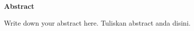 \begin{center}
\textbf{\large Abstract}
\end{center}
\hspace{0.7cm}
Write down your abstract here. Tuliskan abstract anda disini.